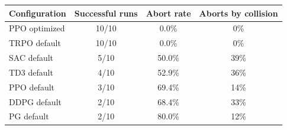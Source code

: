 \begin{tabular}{lccc}
\toprule
Configuration & Successful runs & Abort rate & Aborts by collision \\
\midrule
PPO optimized & 10/10 & 0.0\% & 0\% \\
TRPO default & 10/10 & 0.0\% & 0\% \\
SAC default & 5/10 & 50.0\% & 39\% \\
TD3 default & 4/10 & 52.9\% & 36\% \\
PPO default & 3/10 & 69.4\% & 14\% \\
DDPG default & 2/10 & 68.4\% & 33\% \\
PG default & 2/10 & 80.0\% & 12\% \\
\bottomrule
\end{tabular}
